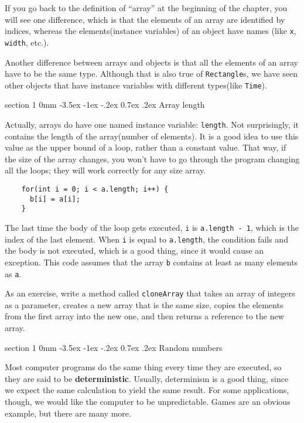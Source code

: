 \documentclass{book}
\makeatletter
\renewcommand{\section}{\@startsection 
    {section} {1} {0mm}%
    {-3.5ex \@plus -1ex \@minus -.2ex}%
    {0.7ex \@plus.2ex}%
    {\normalfont\Large\bfseries}}
\makeatother
\begin{document}
If you go back to the definition of ``array'' at the beginning
of the chapter, you will see one difference, which is that the
elements of an array are identified by indices, whereas the
elements(instance variables) of an object have names
(like {\tt x}, {\tt width}, etc.).

Another difference between arrays and objects is that all the
elements of an array have to be the same type.  Although that
is also true of {\tt Rectangle}s, we have seen other objects
that have instance variables with different types(like
{\tt Time}).

\section{Array length}

Actually, arrays do have one named instance variable: {\tt length}.
Not surprisingly, it contains the length of the array(number
of elements).  It is a good idea to use this value as the upper
bound of a loop, rather than a constant value.  That way, if
the size of the array changes, you won't have to go through the
program changing all the loops; they will work correctly for any
size array.

\begin{verbatim}
    for(int i = 0; i < a.length; i++) {
      b[i] = a[i];
    }
\end{verbatim}
%
The last time the body of the loop gets executed, {\tt i}
is {\tt a.length - 1}, which is the index of the last element.  When
{\tt i} is equal to {\tt a.length}, the condition fails and the body
is not executed, which is a good thing, since it would cause an
exception.  This code assumes that the array {\tt b} contains at least
as many elements as {\tt a}.

As an exercise, write a method called {\tt cloneArray} that takes an
array of integers as a parameter, creates a new array that is the same
size, copies the elements from the first array into the new one, and
then returns a reference to the new array.

\section{Random numbers}
\label{random}
\label{pseudorandom}

Most computer programs do the same thing every time they are executed,
so they are said to be {\bf deterministic}.  Usually, determinism is a
good thing, since we expect the same calculation to yield the same
result.  For some applications, though, we would like the
computer to be unpredictable.  Games are an obvious example, but
there are many more.
\end{document}
